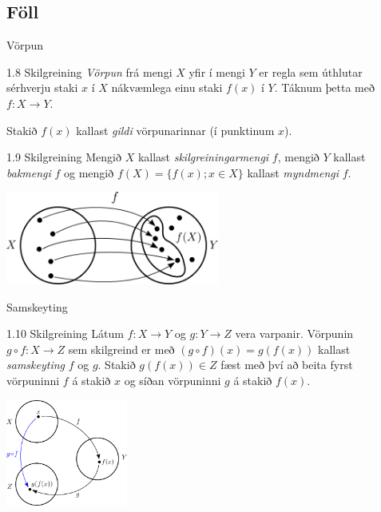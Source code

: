 \documentclass[icelandic,a4paper,12pt]{article}
\begin{document}
\subsection*{Föll}	
\begin{frame}{Vörpun}
\begin{block}{1.8 Skilgreining}
\emph{Vörpun} frá mengi $X$ yfir í mengi $Y$ er regla sem úthlutar sérhverju
staki $x$ í $X$ nákvæmlega einu staki $f(x)$ í $Y$. Táknum þetta með
$f:X \to Y$. 

Stakið $f(x)$ kallast \emph{gildi} vörpunarinnar (í punktinum $x$).
\end{block}

\pause

\begin{block}
{1.9 Skilgreining}
Mengið $X$ kallast \emph{skilgreiningarmengi} $f$, 
mengið $Y$ kallast \emph{bakmengi} $f$ og 
mengið $f(X) = \{ f(x); x \in X \}$ kallast \emph{myndmengi} $f$.
\end{block}

\begin{center}
 \includegraphics[width=7cm,keepaspectratio=true]{./myndir/kafli01/02_Mynd_vorpunar.png}
\end{center}
\end{frame}

\begin{frame}{Samskeyting}
\begin{block}{1.10 Skilgreining}
Látum $f:X \to Y$ og $g:Y \to Z$ vera varpanir. Vörpunin 
$g\circ f:X \to Z$ sem skilgreind er með 
$(g\circ f)(x)=g(f(x))$ kallast \emph{samskeyting} $f$ og 
$g$. 
Stakið 
$g(f(x)) \in Z$ fæst með því að beita fyrst vörpuninni $f$ á stakið 
$x$ og síðan vörpuninni $g$ á stakið $f(x)$.
\end{block}
% 
\begin{center}
 \includegraphics[width=4cm,keepaspectratio=true]{./myndir/kafli01/02_Samskeyting.png}
\end{center}

\end{frame}
\end{document}

